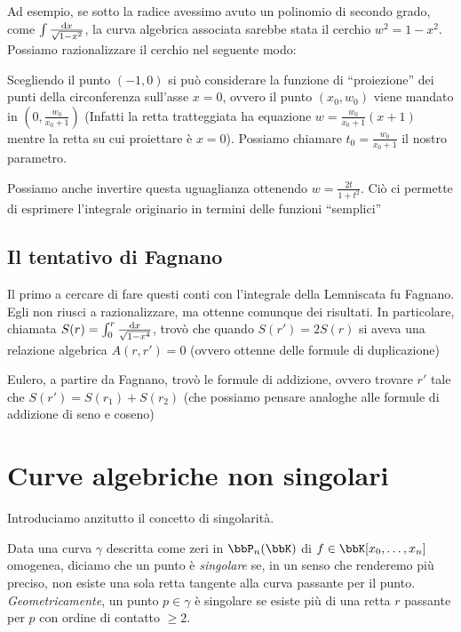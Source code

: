 Ad esempio, se sotto la radice avessimo avuto un polinomio di secondo grado, come $ \int \frac{\text{d} x}{\sqrt{1 - x^2}} $, la curva algebrica
associata sarebbe stata il cerchio $w^2 = 1 - x^2$. Possiamo razionalizzare il cerchio nel seguente modo:

Scegliendo il punto $(-1, 0)$ si può considerare la funzione di ``proiezione'' dei punti della circonferenza sull'asse $x=0$, ovvero il
punto $(x_0, w_0)$ viene mandato in $(0, \frac{w_0}{x_0 + 1})$ (Infatti la retta tratteggiata ha equazione $w = \frac{w_0}{x_0 + 1} (x + 1)$
mentre la retta su cui proiettare è $x=0$). Possiamo chiamare $t_0 = \frac{w_0}{x_0 + 1}$ il nostro parametro.

Possiamo anche invertire questa uguaglianza ottenendo $w = \frac{2 t}{1 + t^2}$. Ciò ci permette di esprimere l'integrale originario in termini delle funzioni ``semplici''


\subsection{Il tentativo di Fagnano}
Il primo a cercare di fare questi conti con l'integrale della Lemniscata fu Fagnano. Egli non riusci a razionalizzare, ma ottenne comunque dei risultati. In particolare, chiamata $S(r) = \int_0^r \frac{\text{d} x}{\sqrt{1 - x^4}}$, trovò che quando $S(r') = 2 S(r)$ si aveva una relazione algebrica $A(r, r') = 0$ (ovvero ottenne delle formule di duplicazione)


Eulero, a partire da Fagnano, trovò le formule di addizione, ovvero trovare $r'$ tale che $S(r') = S(r_1) + S(r_2)$ (che possiamo pensare analoghe alle formule di addizione di seno e coseno)



\section{Curve algebriche non singolari}

Introduciamo anzitutto il concetto di singolarità.

Data una curva $\gamma$ descritta come zeri in $\bbP_n(\bbK)$ di $f \in \bbK[x_0, \ldots,x_n]$ omogenea, diciamo che un punto è
\textit{singolare} se, in un senso che renderemo più preciso, non esiste una sola retta tangente alla curva passante per il punto. \textit{Geometricamente}, un punto $p \in \gamma$ è singolare se esiste più di una retta $r$ passante per $p$ con ordine di contatto $\geq 2$. 
\vspace{1em}

